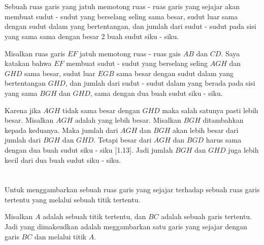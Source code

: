 \documentclass[a4paper, 12pt]{book}
\begin{document}
\section*{\centering \thesection} 
Sebuah ruas garis yang jatuh memotong ruas - ruas garis yang sejajar akan membuat
sudut - sudut yang berselang seling sama besar, sudut luar sama dengan sudut dalam
yang bertentangan, dan jumlah dari sudut - sudut pada sisi yang sama sama dengan
besar 2 buah sudut siku - siku.  


Misalkan ruas garis $EF$ jatuh memotong ruas - ruas gais $AB$ dan $CD$. 
Saya katakan bahwa $EF$ membuat sudut - sudut yang berselang seling 
$AGH$ dan $GHD$ sama besar, sudut luar $EGB$ sama besar dengan sudut dalam
yang bertentangan $GHD$, dan jumlah dari sudut - sudut dalam yang berada 
pada sisi yang sama $BGH$ dan $GHD$, sama dengan dua buah sudut siku - siku.

Karena jika $AGH$ tidak sama besar dengan $GHD$ maka salah satunya pasti
lebih besar. Misalkan $AGH$ adalah yang lebih besar. Misalkan $BGH$ 
ditambahkan kepada keduanya. Maka jumlah dari $AGH$ dan $BGH$ akan 
lebih besar dari jumlah dari $BGH$ dan $GHD$. Tetapi besar dari $AGH$
dan $BGD$ harus sama dengan dua buah sudut siku - siku [1.13]. Jadi
jumlah $BGH$ dan $GHD$ juga lebih kecil dari dua buah sudut siku - siku.

\setcounter{section}{31}
\section*{\centering \thesection} 
Untuk menggambarkan sebuah ruas garis yang sejajar terhadap sebuah ruas 
garis tertentu yang melalui sebuah titik tertentu.


Misalkan $A$ adalah sebuah titik tertentu, dan $BC$ adalah sebuah garis tertentu. Jadi
yang dimaksudkan adalah meggambarkan satu garis yang sejajar dengan garis $BC$ 
dan melalui titik $A$.
\end{document}
